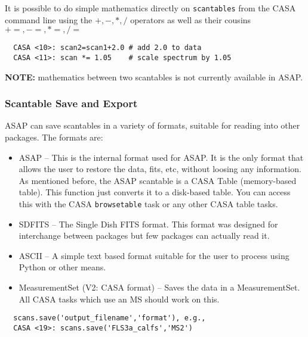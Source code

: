 It is possible to do simple mathematics directly on {\tt scantables}
from the CASA command line using the $+,-,*,/$ operators as well as
their cousins $+=, -=, *=, /=$

\small
\begin{verbatim}
  CASA <10>: scan2=scan1+2.0 # add 2.0 to data 
  CASA <11>: scan *= 1.05    # scale spectrum by 1.05 
\end{verbatim}
\normalsize

{\bf NOTE:} mathematics between two scantables is not currently
available in ASAP.

\subsubsection{Scantable Save and Export}
\label{subsubsection:sd.asap.scantable.export}

ASAP can save scantables in a variety of formats, suitable for reading
into other packages. The formats are: 

\begin{itemize}
    \item ASAP -- This is the internal format used for ASAP. It is the only
     format that allows the user to restore the data, fits, etc,
     without loosing any information. As mentioned before, the ASAP
     scantable is a CASA Table (memory-based table). This function
     just converts it to a disk-based table. You can access this with
     the CASA {\tt browsetable} task or any other CASA table tasks. 

   \item SDFITS -- The Single Dish FITS format. This format was designed
     for interchange between packages but few packages can actually
     read it. 

   \item ASCII -- A simple text based format suitable for the user to
     process using Python or other means. 

   \item MeasurementSet (V2: CASA format) -- Saves the data in a
     MeasurementSet. All CASA tasks which use an MS should work on
     this. 
\end{itemize}

\small
\begin{verbatim}
  scans.save('output_filename','format'), e.g.,
  CASA <19>: scans.save('FLS3a_calfs','MS2')
\end{verbatim}
\normalsize

